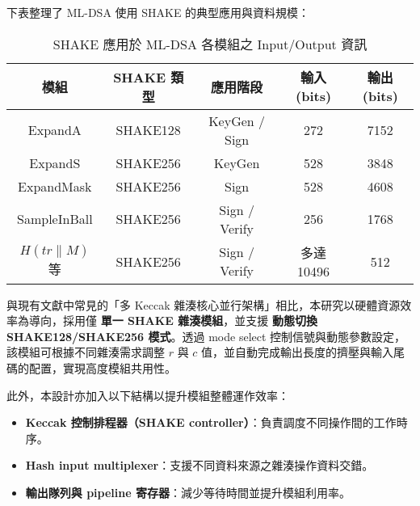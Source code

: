 \documentclass[12pt, a4paper, fleqn]{./styles/ntust_report}
\begin{document}
下表整理了 ML-DSA 使用 SHAKE 的典型應用與資料規模：

\begin{table}[H]
\centering
\caption{SHAKE 應用於 ML-DSA 各模組之 Input/Output 資訊}
\begin{tabular}{|c|c|c|c|c|}
\hline
\textbf{模組} & \textbf{SHAKE 類型} & \textbf{應用階段} & \textbf{輸入(bits)} & \textbf{輸出(bits)} \\
\hline
ExpandA & SHAKE128 & KeyGen / Sign & 272 & 7152 \\
ExpandS & SHAKE256 & KeyGen & 528 & 3848 \\
ExpandMask & SHAKE256 & Sign & 528 & 4608 \\
SampleInBall & SHAKE256 & Sign / Verify & 256 & 1768 \\
$H(tr\|M)$ 等 & SHAKE256 & Sign / Verify & 多達 10496 & 512 \\
\hline
\end{tabular}
\end{table}

與現有文獻中常見的「多 Keccak 雜湊核心並行架構」相比，本研究以硬體資源效率為導向，採用僅 \textbf{單一 SHAKE 雜湊模組}，並支援 \textbf{動態切換 SHAKE128/SHAKE256 模式}。透過 mode select 控制信號與動態參數設定，該模組可根據不同雜湊需求調整 $r$ 與 $c$ 值，並自動完成輸出長度的擠壓與輸入尾碼的配置，實現高度模組共用性。

此外，本設計亦加入以下結構以提升模組整體運作效率：
\begin{itemize}
    \item \textbf{Keccak 控制排程器（SHAKE controller）}：負責調度不同操作間的工作時序。
    \item \textbf{Hash input multiplexer}：支援不同資料來源之雜湊操作資料交錯。
    \item \textbf{輸出隊列與 pipeline 寄存器}：減少等待時間並提升模組利用率。
\end{itemize}









\ifdefined\integrated\else

\end{document}
